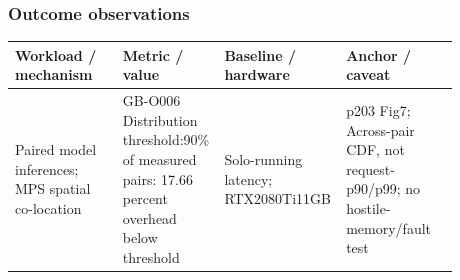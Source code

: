 \documentclass[12pt,a4paper]{article}
\begin{document}
\subsubsection*{Outcome observations}
\begin{longtable}{p{0.24\linewidth}p{0.19\linewidth}p{0.2\linewidth}p{0.25\linewidth}}
\toprule
Workload /\allowbreak{} mechanism & Metric /\allowbreak{} value & Baseline /\allowbreak{} hardware & Anchor /\allowbreak{} caveat\\\midrule
\endhead
Paired model inferences; MPS spatial co-location & GB-O006 Distribution threshold:90\% of measured pairs: 17.66 percent overhead below threshold & Solo-running latency; RTX2080Ti11GB & p203 Fig7; Across-pair CDF, not request-p90/\allowbreak{}p99; no hostile-memory/\allowbreak{}fault test\\
\bottomrule
\end{longtable}
\end{document}
